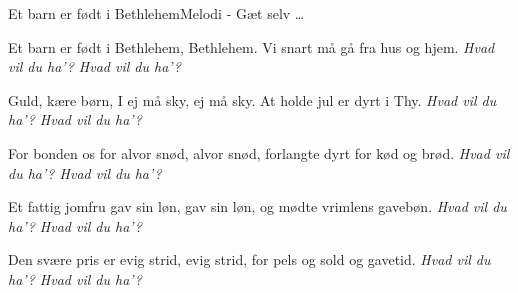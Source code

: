 \begin{sang}{Et barn er født i Bethlehem}{Melodi - Gæt selv \ldots}
\begin{vers}
Et barn er født i Bethlehem,
Bethlehem.
Vi snart må gå fra hus og hjem.
{\em Hvad vil du ha'? Hvad vil du ha'?}
\end{vers}
\begin{vers}
Guld, kære børn, I ej må sky,
ej må sky.
At holde jul er dyrt i Thy.
{\em Hvad vil du ha'? Hvad vil du ha'?}
\end{vers}
\begin{vers}
For bonden os for alvor snød,
alvor snød,
forlangte dyrt for kød og brød.
{\em Hvad vil du ha'? Hvad vil du ha'?}
\end{vers}
\begin{vers}
Et fattig jomfru gav sin løn,
gav sin løn,
og mødte vrimlens gavebøn.
{\em Hvad vil du ha'? Hvad vil du ha'?}
\end{vers}
\begin{vers}
Den svære pris er evig strid,
evig strid,
for pels og sold og gavetid.
{\em Hvad vil du ha'? Hvad vil du ha'?}
\end{vers}
\vbox{}\vfill
\vbox{}\vfill
\vbox{}\vfill
\vbox{}\vfill
\laps
\end{sang}